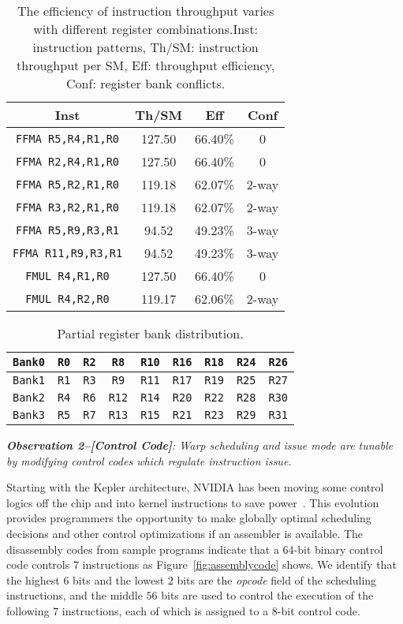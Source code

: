 \begin{table}[htbp]
    \caption{The efficiency of instruction throughput varies with different register combinations.Inst: instruction patterns, Th/SM: instruction throughput per SM, Eff: throughput efficiency,  Conf: register bank conflicts.}
\centering
\scalebox{0.9} {
\begin{tabular}{|c|c|c|c|}
\hline
Inst &Th/SM&Eff&Conf\\
\hline
{\tt FFMA R5,R4,R1,R0}&127.50&66.40\%&0\\
\hline
{\tt FFMA R2,R4,R1,R0}&127.50&66.40\%&0\\
\hline
{\tt FFMA R5,R2,R1,R0}&119.18&62.07\%&2-way\\
\hline
{\tt FFMA R3,R2,R1,R0}&119.18&62.07\%&2-way\\
\hline
{\tt FFMA R5,R9,R3,R1}&94.52&49.23\%&3-way\\
\hline
{\tt FFMA R11,R9,R3,R1}&94.52&49.23\%&3-way\\
\hline
{\tt FMUL R4,R1,R0}&127.50&66.40\%&0\\
\hline
{\tt FMUL R4,R2,R0}&119.17&62.06\%&2-way\\
\hline
\end{tabular}
}
\label{tab:th}
\end{table}


\begin{table}[htbp]
\caption{Partial register bank distribution.}
\centering
\scalebox{0.9} {
\begin{tabular}{|c|c|c|c|c|c|c|c|c|}
\hline
    {\tt Bank0}&{\tt R0}&{\tt R2}&{\tt R8}&{\tt R10}&{\tt R16}&{\tt R18}&{\tt R24}&{\tt R26}\\
\hline
    {\tt Bank1}&{\tt R1}&{\tt R3}&{\tt R9}&{\tt R11}&{\tt R17}&{\tt R19}&{\tt R25}&{\tt R27} \\
\hline
    {\tt Bank2}&{\tt R4}&{\tt R6}&{\tt R12}&{\tt R14}&{\tt R20}&{\tt R22}&{\tt R28}&{\tt R30}\\
\hline
    {\tt Bank3}&{\tt R5}&{\tt R7}&{\tt R13}&{\tt R15}&{\tt R21}&{\tt R23}&{\tt R29}&{\tt R31}\\
\hline
\end{tabular}
}
\label{tab:reg}
\end{table}



{\em {\bf Observation 2--[Control Code]}:
Warp scheduling and issue mode are tunable by modifying control codes which regulate instruction issue.}

Starting with the Kepler architecture, NVIDIA has been moving some control logics off the chip and into kernel
instructions to save power~\cite{lai,maxas}. 
This evolution provides programmers the opportunity to
make globally optimal scheduling decisions and other control optimizations if an assembler is available. 
The disassembly codes from sample programs indicate that a $64$-bit binary control code controls $7$ instructions as Figure~\ref{fig:assemblycode} shows.
We identify that the highest $6$ bits and the lowest $2$ bits are the {\em opcode} field of the scheduling instructions, and the middle $56$ bits are used to control the execution of the following $7$ instructions, each of which is assigned to a $8$-bit control code.


